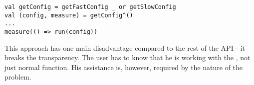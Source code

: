 \lstset{style=Scala}
\begin{lstlisting}
val getConfig = getFastConfig _ or getSlowConfig
val (config, measure) = getConfig^()
...
measure(() => run(config))
\end{lstlisting}

This approach has one main disadvantage compared to the rest of the API - it breaks the transparency. The user has to know that he is working with the , not just normal function. His assistance is, however, required by the nature of the problem.

